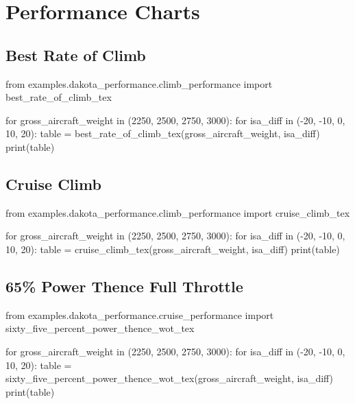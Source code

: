 \section{Performance Charts}

\pagebreak

\subsection{Best Rate of Climb}

\begin{pycode}
from examples.dakota_performance.climb_performance import best_rate_of_climb_tex

for gross_aircraft_weight in (2250, 2500, 2750, 3000):
    for isa_diff in (-20, -10, 0, 10, 20):
        table = best_rate_of_climb_tex(gross_aircraft_weight, isa_diff)
        print(table)
\end{pycode}

\subsection{Cruise Climb}

\begin{pycode}
from examples.dakota_performance.climb_performance import cruise_climb_tex

for gross_aircraft_weight in (2250, 2500, 2750, 3000):
    for isa_diff in (-20, -10, 0, 10, 20):
        table = cruise_climb_tex(gross_aircraft_weight, isa_diff)
        print(table)
\end{pycode}




\subsection{65\% Power Thence Full Throttle}

\begin{pycode}
from examples.dakota_performance.cruise_performance import sixty_five_percent_power_thence_wot_tex

for gross_aircraft_weight in (2250, 2500, 2750, 3000):
    for isa_diff in (-20, -10, 0, 10, 20):
        table = sixty_five_percent_power_thence_wot_tex(gross_aircraft_weight, isa_diff)
        print(table)
\end{pycode}
